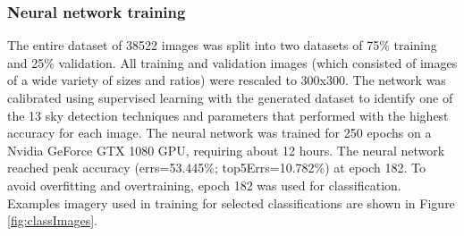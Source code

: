 \documentclass[final,3p,times,authoryear]{elsarticle}
\begin{document}
\subsubsection{Neural network training}\label{sec:nntraining}    

The entire dataset of 38522 images was split into two datasets of 75\% training and 25\% validation. All training and validation images (which consisted of images of a wide variety of sizes and ratios) were rescaled to 300x300. The network was calibrated using supervised learning with the generated dataset to identify one of the 13 sky detection techniques and parameters that performed with the highest accuracy for each image. The neural network was trained for 250 epochs on a Nvidia GeForce GTX 1080 GPU, requiring about 12 hours. The neural network reached peak accuracy (errs=53.445\%; top5Errs=10.782\%) at epoch 182. To avoid overfitting and overtraining, epoch 182 was used for classification. Examples imagery used in training for selected classifications are shown in Figure \ref{fig:classImages}.

\end{document}
